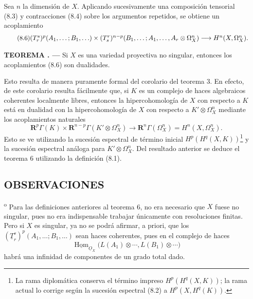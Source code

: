 \documentclass[11pt,twoside,openany]{book}
\numberwithin{equation}{section}
\newcommand{\src}[1]{%
  \phantomsection\hypertarget{src:#1}{}%
  \marginpar{\raggedleft\footnotesize\sffamily #1}%
}
\newcommand{\Osh}{\underline{O}}
\newcommand{\Homsh}{\underline{\operatorname{Hom}}}
\theoremstyle{plain}
\theoremstyle{definition}
\theoremstyle{remark}
\newcommand{\result}[2]{%
  \par\medskip\noindent\textbf{#1%
  \if\relax\detokenize{#2}\relax\else\space#2\fi. ---}\enspace
}
\newcommand{\FgaUnitKey}{frontmatter}
\renewcommand{\src}[1]{%
  \phantomsection\hypertarget{src:\FgaUnitKey:#1}{}%
  \marginpar{\raggedleft\footnotesize\sffamily #1}%
}
\theoremstyle{plain}
\theoremstyle{definition}
\theoremstyle{remark}
\begin{document}
Sea $n$ la dimensión de $X$. Aplicando sucesivamente una composición
tensorial (8.3) y contracciones (8.4) sobre los argumentos repetidos, se
obtiene un acoplamiento
\begin{equation}\tag{8.6}
\resizebox{\textwidth}{!}{$
  (T_{r}^{s})^{p}(A_1,\ldots;B_1,\ldots)
  \times
  (T_{s}^{r})^{n-p}(B_1,\ldots;A_1,\ldots,A_r\otimes\Omega_X^{n})
  \longrightarrow H^{n}(X,\Omega_X^{n}).
$}
\end{equation}

\result{TEOREMA}{6} Si $X$ es una variedad proyectiva no singular, entonces
los acoplamientos (8.6) son dualidades.

Esto resulta de manera puramente formal del corolario del teorema 3. En efecto,
de este corolario resulta fácilmente que, si $K$ es un complejo de haces
algebraicos coherentes localmente libres, entonces la hipercohomología de $X$ con
respecto a $K$ está en dualidad con la hipercohomología de $X$ con respecto a
$K'\otimes\Omega_X^{n}$ mediante los acoplamientos naturales
\begin{equation}\tag{8.7}
  \mathbf R^{p}\Gamma(K)
  \times\mathbf R^{n-p}\Gamma(K'\otimes\Omega_X^{n})
  \longrightarrow\mathbf R^{n}\Gamma(\Omega_X^{n})
  =H^{n}(X,\Omega_X^{n}).
\end{equation}
Esto se ve utilizando la sucesión espectral de término inicial
$H^{p}(H^{q}(X,K))$\footnote{La rama diplomática conserva el término impreso
$H^{p}(H^{q}(X,K))$; la rama actual lo corrige según la sucesión espectral
(8.2) a $H^{p}(X,H^{q}(K))$.} y la sucesión espectral análoga para
$K'\otimes\Omega_X^{n}$. Del resultado anterior se deduce el teorema 6
utilizando la definición (8.1).

\src{192}
\subsection*{OBSERVACIONES}

\textsuperscript{o} Para las definiciones anteriores al teorema 6,
no era necesario que $X$ fuese no singular, pues no era
indispensable trabajar únicamente con resoluciones finitas. Pero si $X$
es singular, ya no se podrá afirmar, a priori, que los
$(\underline{T}_{r}^{s})^{p}(A_1,\ldots;B_1,\ldots)$ sean haces
coherentes, pues en el complejo de haces
\[
  \Homsh_{\Osh_X}\bigl(L(A_1)\otimes\cdots,L(B_1)\otimes\cdots\bigr)
\]
habrá una infinidad de componentes de un grado total dado.
\end{document}
